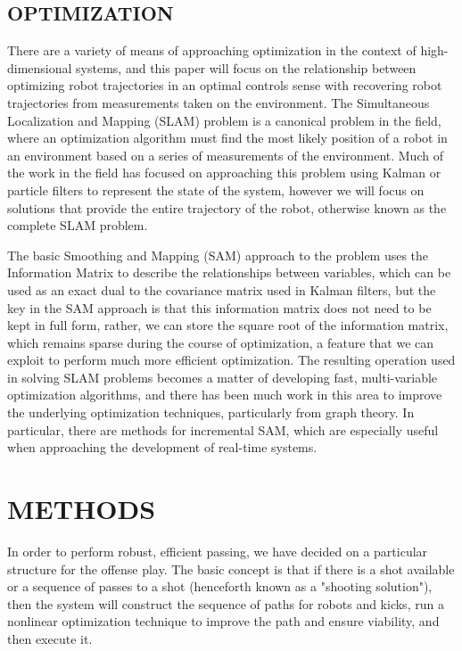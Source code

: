 \documentclass[a4paper, 10pt, conference]{ieeeconf}      %
\begin{document}
\subsection{OPTIMIZATION}

There are a variety of means of approaching optimization in the context of high-dimensional systems, and this paper will focus on the relationship between optimizing robot trajectories in an optimal controls sense with recovering robot trajectories from measurements taken on the environment.  The Simultaneous Localization and Mapping (SLAM) problem is a canonical problem in the field, where an optimization algorithm must find the most likely position of a robot in an environment based on a series of measurements of the environment.  Much of the work in the field has focused on approaching this problem using Kalman or particle filters  \cite{Thrun05book, Thrun04ijrr, Dellaert03tutorial} to represent the state of the system, however we will focus on solutions that provide the entire trajectory of the robot, otherwise known as the complete SLAM problem.  

The basic Smoothing and Mapping (SAM) approach\cite{Dellaert05tr} to the problem uses the Information Matrix to describe the relationships between variables, which can be used as an exact dual to the covariance matrix used in Kalman filters, but the key in the SAM approach is that this information matrix does not need to be kept in full form, rather, we can store the square root of the information matrix, which remains sparse during the course of optimization, a feature that we can exploit to perform much more efficient optimization.  The resulting operation used in solving SLAM problems becomes a matter of developing fast, multi-variable optimization algorithms, and there has been much work in this area to improve the underlying optimization techniques, particularly from graph theory\cite{Triggs99, Bertele72jmaa, Bertele72book}.  In particular, there are methods for incremental SAM\cite{Dellaert06ijrr}, which are especially useful when approaching the development of real-time systems.

\section{METHODS}
In order to perform robust, efficient passing, we have decided on a particular structure for the offense play. The basic concept is that if there is a shot available or a sequence of passes to a shot (henceforth known as a "shooting solution"), then the system will construct the sequence of paths for robots and kicks, run a nonlinear optimization technique to improve the path and ensure viability, and then execute it.
\end{document}
